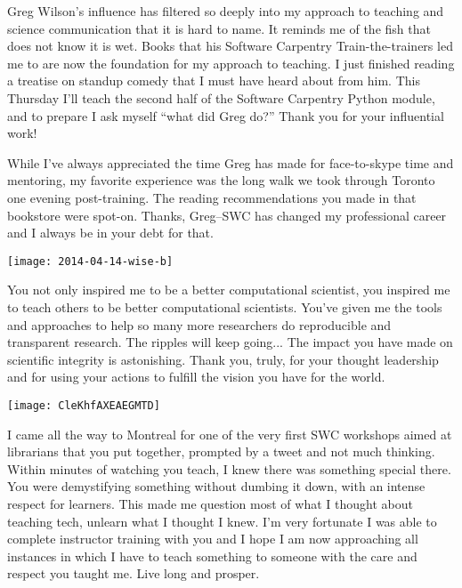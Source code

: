 Greg Wilson's influence has filtered so deeply into my approach to teaching and
science communication that it is hard to name.  It reminds me of the fish that
does not know it is wet.  Books that his Software Carpentry Train-the-trainers
led me to are now the foundation for my approach to teaching.  I just finished
reading a treatise on standup comedy that I must have heard about from him.
This Thursday I'll teach the second half of the Software Carpentry Python
module, and to prepare I ask myself ``what did Greg do?'' Thank you for your
influential work!



While I've always appreciated the time Greg has made for face-to-skype time and
mentoring, my favorite experience was the long walk we took through Toronto one
evening post-training.  The reading recommendations you made in that bookstore
were spot-on.  Thanks, Greg--SWC has changed my professional career and I always
be in your debt for that.


\newpage

\begin{center}
\texttt{[image: 2014-04-14-wise-b]}
\end{center}

You not only inspired me to be a better computational scientist, you inspired
me to teach others to be better computational scientists. You've given me the
tools and approaches to help so many more researchers do reproducible and
transparent research. The ripples will keep going... The impact you have made
on scientific integrity is astonishing. Thank you, truly, for your thought
leadership and for using your actions to fulfill the vision you have for the
world. 


\newpage

\begin{center}
\texttt{[image: CleKhfAXEAEGMTD]}
\end{center}

I came all the way to Montreal for one of the very first SWC workshops aimed at
librarians that you put together, prompted by a tweet and not much thinking.
Within minutes of watching you teach, I knew there was something special there.
You were demystifying something without dumbing it down, with an intense
respect for learners. This made me question most of what I thought about
teaching tech, unlearn what I thought I knew. I'm very fortunate I was able to
complete instructor training with you and I hope I am now approaching all
instances in which I have to teach something to someone with the care and
respect you taught me. Live long and prosper.

